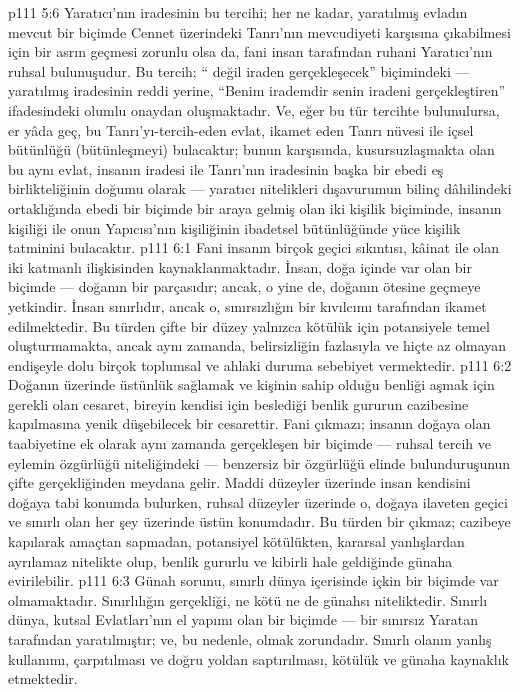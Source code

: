 \vs p111 5:6 Yaratıcı’nın iradesinin bu tercihi; her ne kadar, yaratılmış evladın mevcut bir biçimde Cennet üzerindeki Tanrı’nın mevcudiyeti karşısına çıkabilmesi için bir asrın geçmesi zorunlu olsa da, fani insan tarafından ruhani Yaratıcı’nın ruhsal bulunuşudur. Bu tercih; “ değil  iraden gerçekleşecek” biçimindeki --- yaratılmış iradesinin reddi yerine, “Benim irademdir senin iradeni gerçekleştiren” ifadesindeki olumlu onaydan oluşmaktadır. Ve, eğer bu tür tercihte bulunulursa, er yâda geç, bu Tanrı’yı\hyp{}tercih\hyp{}eden evlat, ikamet eden Tanrı nüvesi ile içsel bütünlüğü (bütünleşmeyi) bulacaktır; bunun karşısında, kusursuzlaşmakta olan bu aynı evlat, insanın iradesi ile Tanrı’nın iradesinin başka bir ebedi eş birlikteliğinin doğumu olarak --- yaratıcı nitelikleri dışavurumun bilinç dâhilindeki ortaklığında ebedi bir biçimde bir araya gelmiş olan iki kişilik biçiminde, insanın kişiliği ile onun Yapıcısı’nın kişiliğinin ibadetsel bütünlüğünde yüce kişilik tatminini bulacaktır.
\vs p111 6:1 Fani insanın birçok geçici sıkıntısı, kâinat ile olan iki katmanlı ilişkisinden kaynaklanmaktadır. İnsan, doğa içinde var olan bir biçimde --- doğanın bir parçasıdır; ancak, o yine de, doğanın ötesine geçmeye yetkindir. İnsan sınırlıdır, ancak o, sınırsızlığın bir kıvılcımı tarafından ikamet edilmektedir. Bu türden çifte bir düzey yalnızca kötülük için potansiyele temel oluşturmamakta, ancak aynı zamanda, belirsizliğin fazlasıyla ve hiçte az olmayan endişeyle dolu birçok toplumsal ve ahlaki duruma sebebiyet vermektedir.
\vs p111 6:2 Doğanın üzerinde üstünlük sağlamak ve kişinin sahip olduğu benliği aşmak için gerekli olan cesaret, bireyin kendisi için beslediği benlik gururun cazibesine kapılmasına yenik düşebilecek bir cesarettir. Fani çıkmazı; insanın doğaya olan taabiyetine ek olarak aynı zamanda gerçekleşen bir biçimde --- ruhsal tercih ve eylemin özgürlüğü niteliğindeki --- benzersiz bir özgürlüğü elinde bulunduruşunun çifte gerçekliğinden meydana gelir. Maddi düzeyler üzerinde insan kendisini doğaya tabi konumda bulurken, ruhsal düzeyler üzerinde o, doğaya ilaveten geçici ve sınırlı olan her şey üzerinde üstün konumdadır. Bu türden bir çıkmaz; cazibeye kapılarak amaçtan sapmadan, potansiyel kötülükten, kararsal yanlışlardan ayrılamaz nitelikte olup, benlik gururlu ve kibirli hale geldiğinde günaha evirilebilir.
\vs p111 6:3 Günah sorunu, sınırlı dünya içerisinde içkin bir biçimde var olmamaktadır. Sınırlılığın gerçekliği, ne kötü ne de günahsı niteliktedir. Sınırlı dünya, kutsal Evlatları’nın el yapımı olan bir biçimde --- bir sınırsız Yaratan tarafından yaratılmıştır; ve, bu nedenle,  olmak zorundadır. Sınırlı olanın yanlış kullanımı, çarpıtılması ve doğru yoldan saptırılması, kötülük ve günaha kaynaklık etmektedir.

